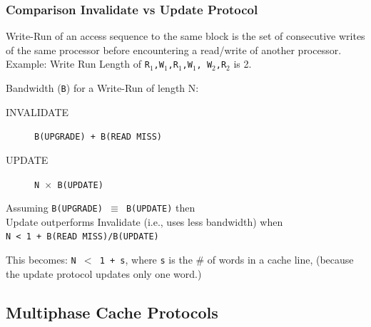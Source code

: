 \documentclass{beamer}
\newcommand{\emp}[1]{\textcolor{DikuRed}{ #1}}
\begin{document}
\begin{frame}[fragile,t]
\frametitle{Comparison Invalidate vs Update Protocol}

\emp{Write-Run} of an access sequence to the same block is
the set of consecutive writes of the same processor before 
encountering a read/write of another processor.\\
\smallskip
Example: Write Run Length of {\tt R$_1$,W$_1$,R$_1$,W$_1$, W$_2$,R$_2$} is 2.
\bigskip

Bandwidth ({\tt B}) for a Write-Run of length N:
\begin{description}
    \item[INVALIDATE] {\tt B(UPGRADE) + B(READ MISS)}
    \item[UPDATE]     {\tt N $\times$ B(UPDATE)}
\end{description}

Assuming {\tt B(UPGRADE) $\equiv$ B(UPDATE)} then\\
\emp{Update outperforms Invalidate (i.e., uses less bandwidth) when}\\\pause
\emp{{\tt N < 1 + B(READ MISS)/B(UPDATE)}}
\medskip

This becomes: \emp{\tt N $<$ 1 + s}, where {\tt s} is the \# of words in a cache line, 
(because the update protocol updates only one word.)
\end{frame}

\subsection{Multiphase Cache Protocols}
\end{document}
